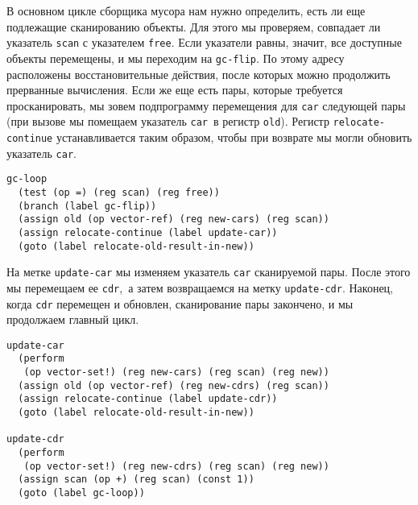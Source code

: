 В основном цикле сборщика мусора нам нужно определить,
есть ли еще подлежащие сканированию объекты.  Для этого мы проверяем,
совпадает ли указатель {\tt scan} с указателем
{\tt free}.  Если указатели равны, значит, все
доступные объекты перемещены, и мы переходим на {\tt gc-flip}.
По этому адресу расположены восстановительные действия, после которых
можно продолжить прерванные вычисления.  Если же еще есть пары,
которые требуется просканировать, мы зовем подпрограмму перемещения
для {\tt car} следующей пары (при вызове мы
помещаем указатель {\tt car}~в регистр
{\tt old}). Регистр {\tt relocate-continue}
устанавливается таким образом, чтобы при возврате мы могли обновить
указатель {\tt car}.

\begin{Verbatim}[fontsize=\small]
gc-loop
  (test (op =) (reg scan) (reg free))
  (branch (label gc-flip))
  (assign old (op vector-ref) (reg new-cars) (reg scan))
  (assign relocate-continue (label update-car))
  (goto (label relocate-old-result-in-new))
\end{Verbatim}

На метке {\tt update-car} мы изменяем указатель
{\tt car} сканируемой пары.  После этого мы перемещаем ее
{\tt cdr},~а затем возвращаемся на метку
{\tt update-cdr}.  Наконец, когда {\tt cdr} перемещен и
обновлен, сканирование пары закончено, и мы продолжаем главный цикл.

\begin{Verbatim}[fontsize=\small]
update-car
  (perform
   (op vector-set!) (reg new-cars) (reg scan) (reg new))
  (assign old (op vector-ref) (reg new-cdrs) (reg scan))
  (assign relocate-continue (label update-cdr))
  (goto (label relocate-old-result-in-new))

update-cdr
  (perform
   (op vector-set!) (reg new-cdrs) (reg scan) (reg new))
  (assign scan (op +) (reg scan) (const 1))
  (goto (label gc-loop))
\end{Verbatim}

